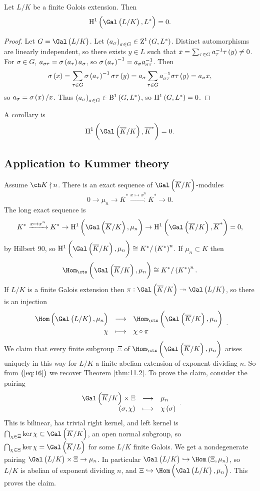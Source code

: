 \pagebreak

\begin{theorem*}
Let $ L / K $ be a finite Galois extension. Then
$$ \H^1\br{\Gal\br{L / K}, L^*} = 0. $$
\end{theorem*}

\begin{proof}
Let $ G = \Gal\br{L / K} $. Let $ \br{a_\sigma}_{\sigma \in G} \in \Z^1\br{G, L^*} $. Distinct automorphisms are linearly independent, so there exists $ y \in L $ such that $ x = \sum_{\tau \in G} a_\tau^{-1}\tau\br{y} \ne 0 $. For $ \sigma \in G $, $ a_{\sigma\tau} = \sigma\br{a_\tau}a_\sigma $, so $ \sigma\br{a_\tau}^{-1} = a_\sigma a_{\sigma\tau}^{-1} $. Then
$$ \sigma\br{x} = \sum_{\tau \in G} \sigma\br{a_\tau}^{-1}\sigma\tau\br{y} = a_\sigma\sum_{\tau \in G} a_{\sigma\tau}^{-1}\sigma\tau\br{y} = a_\sigma x, $$
so $ a_\sigma = \sigma\br{x} / x $. Thus $ \br{a_\sigma}_{\sigma \in G} \in \B^1\br{G, L^*} $, so $ \H^1\br{G, L^*} = 0 $.
\end{proof}

A corollary is
$$ \H^1\br{\Gal\br{\overline{K} / K}, \overline{K}^*} = 0. $$

\subsection{Application to Kummer theory}

Assume $ \ch K \nmid n $. There is an exact sequence of $ \Gal\br{\overline{K} / K} $-modules
$$ 0 \to \mu_n \to \overline{K}^* \xrightarrow{x \mapsto x^n} \overline{K}^* \to 0. $$
The long exact sequence is
$$ K^* \xrightarrow{x \mapsto x^n} K^* \to \H^1\br{\Gal\br{\overline{K} / K}, \mu_n} \to \H^1\br{\Gal\br{\overline{K} / K}, \overline{K}^*} = 0, $$
by Hilbert 90, so $ \H^1\br{\Gal\br{\overline{K} / K}, \mu_n} \cong K^* / \br{K^*}^n $. If $ \mu_n \subset K $ then
\begin{equation}
\label{eq:16}
\Hom_{\cts}\br{\Gal\br{\overline{K} / K}, \mu_n} \cong K^* / \br{K^*}^n.
\end{equation}
If $ L / K $ is a finite Galois extension then $ \pi : \Gal\br{\overline{K} / K} \twoheadrightarrow \Gal\br{L / K} $, so there is an injection
$$ \function{\Hom\br{\Gal\br{L / K}, \mu_n}}{\Hom_{\cts}\br{\Gal\br{\overline{K} / K}, \mu_n}}{\chi}{\chi \circ \pi}. $$
We claim that every finite subgroup $ \Xi $ of $ \Hom_{\cts}\br{\Gal\br{\overline{K} / K}, \mu_n} $ arises uniquely in this way for $ L / K $ a finite abelian extension of exponent dividing $ n $. So from $ \br{\ref{eq:16}} $ we recover Theorem \ref{thm:11.2}. To prove the claim, consider the pairing
$$ \function{\Gal\br{\overline{K} / K} \times \Xi}{\mu_n}{\br{\sigma, \chi}}{\chi\br{\sigma}}. $$
This is bilinear, has trivial right kernel, and left kernel is $ \bigcap_{\chi \in \Xi} \ker \chi \subset \Gal\br{\overline{K} / K} $, an open normal subgroup, so $ \bigcap_{\chi \in \Xi} \ker \chi = \Gal\br{\overline{K} / L} $ for some $ L / K $ finite Galois. We get a nondegenerate pairing $ \Gal\br{L / K} \times \Xi \to \mu_n $. In particular $ \Gal\br{L / K} \hookrightarrow \Hom\br{\Xi, \mu_n} $, so $ L / K $ is abelian of exponent dividing $ n $, and $ \Xi \hookrightarrow \Hom\br{\Gal\br{L / K}, \mu_n} $. This proves the claim.

